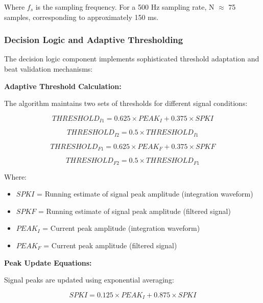 \documentclass[12pt,a4paper]{article}
\begin{document}
Where $f_s$ is the sampling frequency. For a 500 Hz sampling rate, N $\approx$ 75 samples, corresponding to approximately 150 ms.

\subsubsection{Decision Logic and Adaptive Thresholding}

The decision logic component implements sophisticated threshold adaptation and beat validation mechanisms:

\vspace{0.5cm}

\textbf{Adaptive Threshold Calculation:}

The algorithm maintains two sets of thresholds for different signal conditions:

\begin{equation*}
THRESHOLD_{I1} = 0.625 \times PEAK_I + 0.375 \times SPKI
\end{equation*}

\begin{equation*}
THRESHOLD_{I2} = 0.5 \times THRESHOLD_{I1}
\end{equation*}

\begin{equation*}
THRESHOLD_{F1} = 0.625 \times PEAK_F + 0.375 \times SPKF
\end{equation*}

\begin{equation*}
THRESHOLD_{F2} = 0.5 \times THRESHOLD_{F1}
\end{equation*}

Where:
\begin{itemize}
\item $SPKI$ = Running estimate of signal peak amplitude (integration waveform)
\item $SPKF$ = Running estimate of signal peak amplitude (filtered signal)
\item $PEAK_I$ = Current peak amplitude (integration waveform)
\item $PEAK_F$ = Current peak amplitude (filtered signal)
\end{itemize}

\vspace{0.5cm}

\textbf{Peak Update Equations:}

Signal peaks are updated using exponential averaging:

\begin{equation*}
SPKI = 0.125 \times PEAK_I + 0.875 \times SPKI
\end{equation*}
\end{document}
